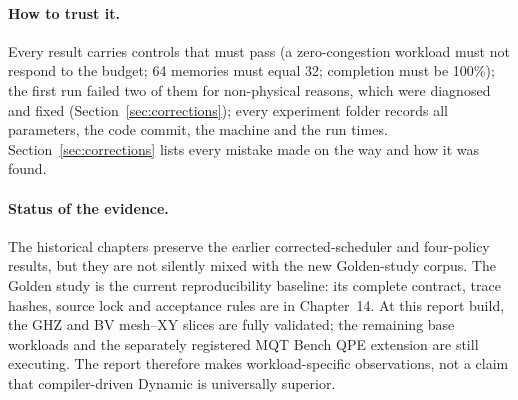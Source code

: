\paragraph{How to trust it.} Every result carries controls that must pass (a zero-congestion workload must not respond to the budget; 64 memories must equal 32; completion must be 100\%); the first run failed two of them for non-physical reasons, which were diagnosed
and fixed (Section~\ref{sec:corrections}); every experiment folder records all parameters, the code commit, the machine and the run times. Section~\ref{sec:corrections} lists every mistake made on the way and how it was found.

\paragraph{Status of the evidence.} The historical chapters preserve the earlier
corrected-scheduler and four-policy results, but they are not silently mixed with
the new Golden-study corpus. The Golden study is the current reproducibility
baseline: its complete contract, trace hashes, source lock and acceptance rules
are in Chapter~14. At this report build, the GHZ and BV mesh--XY slices are fully
validated; the remaining base workloads and the separately registered MQT Bench
QPE extension are still executing. The report therefore makes workload-specific
observations, not a claim that compiler-driven Dynamic is universally superior.
